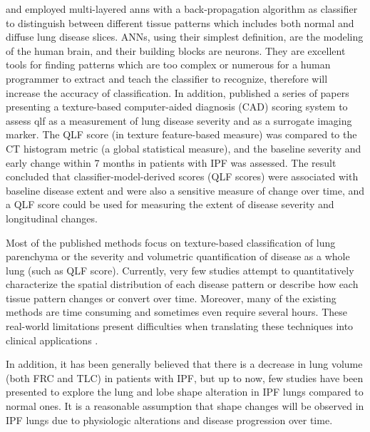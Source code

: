 \cite{uchiyama2003quantitative} and \cite{kim2005computer} employed multi-layered \gls{anns} with a back-propagation algorithm as classifier to distinguish between different tissue patterns which includes both normal and diffuse lung disease slices. ANNs, using their simplest definition, are the modeling of the human brain, and their building blocks are neurons. They are excellent tools for finding patterns which are too complex or numerous for a human programmer to extract and teach the classifier to recognize, therefore will increase the accuracy of classification. In addition, \cite{kim2010computer,kim2011quantitative,kim2015comparison} published a series of papers presenting a texture-based computer-aided diagnosis (CAD) scoring system to assess \gls{qlf} as a measurement of lung disease severity and as a surrogate imaging marker. The QLF score (in texture feature-based measure) was compared to the CT histogram metric (a global statistical measure), and the baseline severity and early change within 7 months in patients with IPF was assessed. The result concluded that classifier-model-derived scores (QLF scores) were associated with baseline disease extent and were also a sensitive measure of change over time, and a QLF score could be used for measuring the extent of disease severity and longitudinal changes.

Most of the published methods focus on texture-based classification of lung parenchyma or the severity and volumetric quantification of disease as a whole lung (such as QLF score). Currently, very few studies attempt to quantitatively characterize the spatial distribution of each disease pattern or describe how each tissue pattern changes or convert over time. Moreover, many of the existing methods are time consuming and sometimes even require several hours. These real-world limitations present difficulties when translating these techniques into clinical applications \citep{bartholmai2013quantitative}.

In addition, it has been generally believed that there is a decrease in lung volume (both FRC and TLC) in patients with IPF, but up to now, few studies have been presented to explore the lung and lobe shape alteration in IPF lungs compared to normal ones. It is a reasonable assumption that shape changes will be observed in IPF lungs due to physiologic alterations and disease progression over time. 

